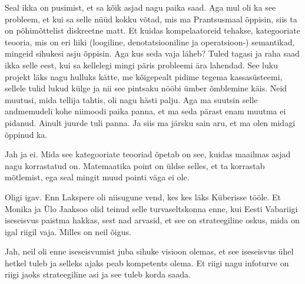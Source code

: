                  
Seal ikka on pusimist, et sa kõik asjad nagu paika saad. Aga mul oli ka see probleem, et kui sa selle nüüd kokku võtad, mis ma  Prantsusmaal õppisin, siis ta on põhimõttelist diskreetne matt. Et kuidas  kompelaatoreid tehakse, kategooriate teooria, mis on eri liiki (loogiline, denotatsiooniline ja operatsioon-) semantikad, mingeid sihukesi asju õppisin. Aga kus seda vaja läheb?  Tuled tagasi ja raha saad ikka selle eest, kui sa kellelegi mingi päris probleemi ära lahendad. See luku projekt läks nagu hulluks kätte, me kõigepealt pidime tegema kassasüsteemi, sellele tulid lukud külge ja nii see pintsaku nööbi ümber õmblemine käis. Neid muutusi, mida tellija tahtis, oli nagu hästi palju. Aga ma suutsin  selle andmemudeli kohe niimoodi paika panna, et ma seda pärast enam muutma ei pidanud. Ainult juurde tuli panna. Ja siis ma järsku sain aru, et ma olen midagi õppinud ka.


Jah ja ei. Mida  see kategooriate teooriad õpetab on see, kuidas  maailmas asjad nagu korrastatud on. Matemaatika point on üldse selles, et ta korrastab mõtlemist, ega seal mingit muud pointi väga ei ole.
                 

Oligi igav. Enn Lakspere oli niisugune vend, kes kes läks Küberisse tööle. Et Monika ja Ülo Jaaksoo olid teinud selle turvaseltskonna enne, kui Eesti Vabariigi iseseisvus paistma hakkas, sest nad arvasid, et see on strateegiline oskus, mida on igal riigil vaja. Milles on neil õigus.
                 
                 
Jah, neil oli enne iseseisvumist juba sihuke visioon olemas, et see iseseisvus ühel hetkel tuleb ja selleks ajaks peab kompetents olema. Et riigi nagu infoturve on riigi jaoks strateegiline asi ja see tuleb korda saada.


